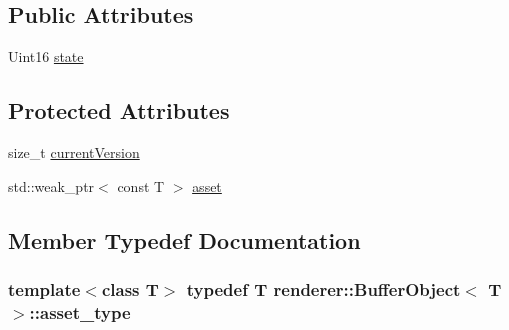 \subsection*{Public Attributes}
\begin{DoxyCompactItemize}
\item 
Uint16 \hyperlink{classrenderer_1_1BufferObject_a2eb925a833a8b046911f48607cb255e7}{state}
\end{DoxyCompactItemize}
\subsection*{Protected Attributes}
\begin{DoxyCompactItemize}
\item 
size\-\_\-t \hyperlink{classrenderer_1_1BufferObject_a8e0f07fa5f1cbf15e3235c478a9f3d42}{current\-Version}
\item 
std\-::weak\-\_\-ptr$<$ const T $>$ \hyperlink{classrenderer_1_1BufferObject_ad747c7e09a4acda6847b6fca9977eed6}{asset}
\end{DoxyCompactItemize}


\subsection{Member Typedef Documentation}
\hypertarget{classrenderer_1_1BufferObject_a651cbaff8aa7148d72a9eaf71ad3636e}{
\subsubsection[{asset\-\_\-type}]{\setlength{\rightskip}{0pt plus 5cm}template$<$class T$>$ typedef T {\bf renderer\-::\-Buffer\-Object}$<$ T $>$\-::{\bf asset\-\_\-type}}}\label{classrenderer_1_1BufferObject_a651cbaff8aa7148d72a9eaf71ad3636e}


